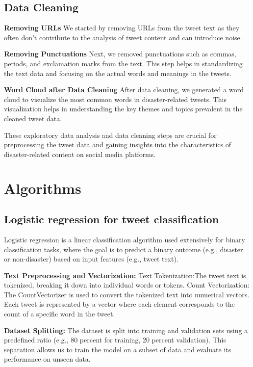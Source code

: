 \subsection{Data Cleaning}

\textbf{Removing URLs}
We started by removing URLs from the tweet text as they often don't contribute to the analysis of tweet content and can introduce noise.

\textbf{Removing Punctuations}
Next, we removed punctuations such as commas, periods, and exclamation marks from the text. This step helps in standardizing the text data and focusing on the actual words and meanings in the tweets.

\textbf{Word Cloud after Data Cleaning}
After data cleaning, we generated a word cloud to visualize the most common words in disaster-related tweets. This visualization helps in understanding the key themes and topics prevalent in the cleaned tweet data.

These exploratory data analysis and data cleaning steps are crucial for preprocessing the tweet data and gaining insights into the characteristics of disaster-related content on social media platforms.

\section{Algorithms}


\subsection{Logistic regression for tweet classification}
Logistic regression is a linear classification algorithm used extensively for binary classification tasks, where the goal is to predict a binary outcome (e.g., disaster or non-disaster) based on input features (e.g., tweet text).

\textbf{Text Preprocessing and Vectorization:}
Text Tokenization:The tweet text is tokenized, breaking it down into individual words or tokens. Count Vectorization: The CountVectorizer is used to convert the tokenized text into numerical vectors. Each tweet is represented by a vector where each element corresponds to the count of a specific word in the tweet.

\textbf{Dataset Splitting:}
The dataset is split into training and validation sets using a predefined ratio (e.g., 80 percent for training, 20 percent validation).
This separation allows us to train the model on a subset of data and evaluate its performance on unseen data.

